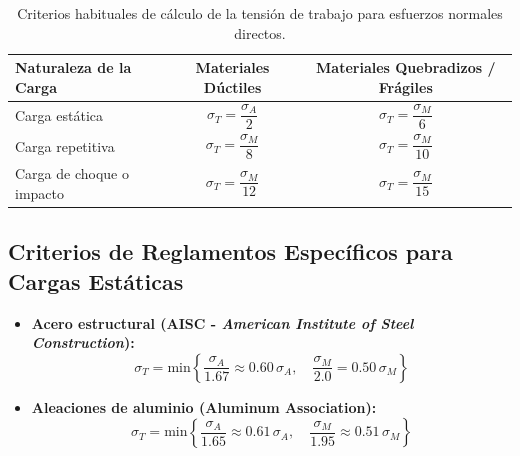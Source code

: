 \begin{table}[H]
    \centering
    \begin{tabular}{lcc}
        \toprule
        \textbf{Naturaleza de la Carga} & \textbf{Materiales Dúctiles}      & \textbf{Materiales Quebradizos / Frágiles} \\
        \midrule
        Carga estática                  & $\sigma_T = \dfrac{\sigma_A}{2}$  & $\sigma_T = \dfrac{\sigma_M}{6}$           \\[8pt]
        Carga repetitiva                & $\sigma_T = \dfrac{\sigma_M}{8}$  & $\sigma_T = \dfrac{\sigma_M}{10}$          \\[8pt]
        Carga de choque o impacto       & $\sigma_T = \dfrac{\sigma_M}{12}$ & $\sigma_T = \dfrac{\sigma_M}{15}$          \\
        \bottomrule
    \end{tabular}
    \caption{Criterios habituales de cálculo de la tensión de trabajo para esfuerzos normales directos.}
    \label{tab:criterios_esfuerzo_diseno}
\end{table}

\subsection{Criterios de Reglamentos Específicos para Cargas Estáticas}
\begin{itemize}
    \item \textbf{Acero estructural (AISC - \textit{American Institute of Steel Construction}):}
          \begin{equation}
              \sigma_T = \text{min}\left\{\frac{\sigma_A}{1.67} \approx 0.60 \, \sigma_A, \quad \frac{\sigma_M}{2.0} = 0.50 \, \sigma_M\right\}
              \label{eq:criterio_aisc}
          \end{equation}
    \item \textbf{Aleaciones de aluminio (Aluminum Association):}
          \begin{equation}
              \sigma_T = \text{min}\left\{\frac{\sigma_A}{1.65} \approx 0.61 \, \sigma_A, \quad \frac{\sigma_M}{1.95} \approx 0.51 \, \sigma_M\right\}
              \label{eq:criterio_aa}
          \end{equation}
\end{itemize}
